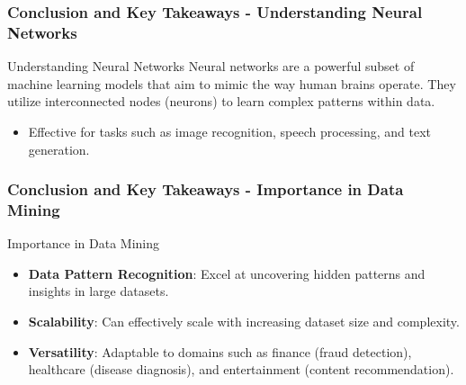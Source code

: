 \documentclass[aspectratio=169]{beamer}
\begin{document}
\begin{frame}[fragile]
    \frametitle{Conclusion and Key Takeaways - Understanding Neural Networks}
    \begin{block}{Understanding Neural Networks}
        Neural networks are a powerful subset of machine learning models that aim to mimic the way human brains operate. They utilize interconnected nodes (neurons) to learn complex patterns within data.
    \end{block}
    
    \begin{itemize}
        \item Effective for tasks such as image recognition, speech processing, and text generation.
    \end{itemize}
\end{frame}

\begin{frame}[fragile]
    \frametitle{Conclusion and Key Takeaways - Importance in Data Mining}
    \begin{block}{Importance in Data Mining}
        \begin{itemize}
            \item \textbf{Data Pattern Recognition}: Excel at uncovering hidden patterns and insights in large datasets.
            \item \textbf{Scalability}: Can effectively scale with increasing dataset size and complexity.
            \item \textbf{Versatility}: Adaptable to domains such as finance (fraud detection), healthcare (disease diagnosis), and entertainment (content recommendation).
        \end{itemize}
    \end{block}
\end{frame}
\end{document}
